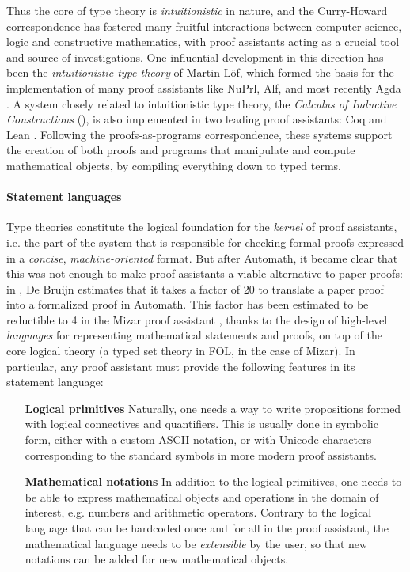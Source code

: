 Thus the core of type theory is \emph{intuitionistic} in nature, and the
Curry-Howard correspondence has fostered many fruitful interactions between
computer science, logic and constructive mathematics, with proof assistants
acting as a crucial tool and source of investigations. One influential
development in this direction has been the \emph{intuitionistic type theory} of
Martin-Löf, which formed the basis for the implementation of many proof
assistants like NuPrl, Alf, and most recently Agda \cite{geuvers_proof_2009}. A
system closely related to intuitionistic type theory, the \emph{Calculus of
Inductive Constructions} (), is also implemented in two leading proof
assistants: Coq  and Lean
. Following the proofs-as-programs
correspondence, these systems support the creation of both proofs and programs
that manipulate and compute mathematical objects, by compiling everything down
to typed terms.

\paragraph{Statement languages}

Type theories constitute the logical foundation for the \emph{kernel} of proof
assistants, i.e. the part of the system that is responsible for checking formal
proofs expressed in a \emph{concise}, \emph{machine-oriented} format. But after
Automath, it became clear that this was not enough to make proof assistants a
viable alternative to paper proofs: in
, De Bruijn estimates that it takes a
factor of 20 to translate a paper proof into a formalized proof in Automath.
This factor has been estimated to be reductible to 4 in the Mizar proof
assistant , thanks to the design of high-level
\emph{languages} for representing mathematical statements and proofs, on top of
the core logical theory (a typed set theory in FOL, in the case of Mizar). In
particular, any proof assistant must provide the following features in its
statement language:

\begin{itemize}
  \item[\textbf{Logical primitives}] Naturally, one needs a way to write
  propositions formed with logical connectives and quantifiers. This is usually
  done in symbolic form, either with a custom ASCII notation, or with Unicode
  characters corresponding to the standard symbols in more modern proof
  assistants. 
  \item[\textbf{Mathematical notations}] In addition to the logical primitives,
  one needs to be able to express mathematical objects and operations in the
  domain of interest, e.g. numbers and arithmetic operators. Contrary to the
  logical language that can be hardcoded once and for all in the proof
  assistant, the mathematical language needs to be \emph{extensible} by the
  user, so that new notations can be added for new mathematical objects.
\end{itemize}

